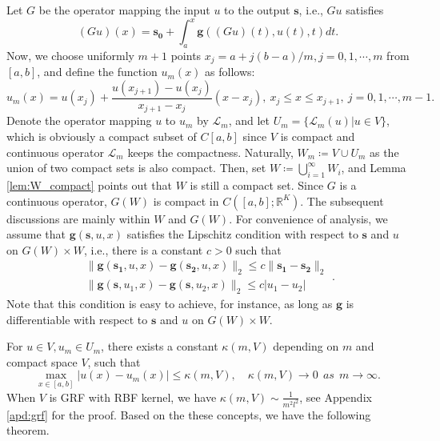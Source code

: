 \documentclass[11pt]{article}
\begin{document}
Let $G$ be the operator mapping the input $u$ to the output $\boldsymbol{s}$, i.e., $Gu$ satisfies
\begin{equation*}\label{eq:Gu}
    (Gu)(x)=\boldsymbol{s_0}+\int_a^x\boldsymbol{g}((Gu)(t),u(t),t)dt.
\end{equation*}
Now, we choose uniformly $m+1$ points $x_{j}=a+j(b-a)/m,j=0,1,\cdots,m$ from $[a,b]$, and define the function $u_{m}(x)$ as follows:
\begin{equation*}
    u_m(x)=u(x_j)+\frac{u(x_{j+1})-u(x_j)}{x_{j+1}-x_j} (x-x_j),\ x_j\leq x\leq x_{j+1},\ j=0,1,\cdots,m-1.
\end{equation*}
Denote the operator mapping $u$ to $u_{m}$ by $\mathcal{L}_{m}$, and let $U_{m}=\{\mathcal{L}_{m}(u)|u\in V\}$, which is obviously a compact subset of $C[a,b]$ since $V$ is compact and continuous operator $\mathcal{L}_{m}$  keeps the compactness. Naturally, $W_{m}\coloneqq V\cup U_{m}$ as the union of two compact sets is also compact. Then, set $W\coloneqq\bigcup_{i=1}^{\infty}W_{i}$, and Lemma \ref{lem:W_compact} points out that $W$ is still a compact set.
Since $G$ is a continuous operator,  $G(W)$ is compact in $C([a,b];\mathbb{R}^{K})$.
The subsequent discussions are mainly within $W$ and $G(W)$. For convenience of analysis, we assume that $\boldsymbol{g}(\boldsymbol{s},u,x)$ satisfies the Lipschitz condition with respect to $\boldsymbol{s}$ and $u$ on $G(W)\times W$, i.e., there is a constant $c>0$ such that
\begin{equation*}
    \begin{array}{l}
    \|\boldsymbol{g}(\boldsymbol{s_1},u,x)-\boldsymbol{g}(\boldsymbol{s_2},u,x)\|_{2}\leq c\|\boldsymbol{s_1}-\boldsymbol{s_2}\|_{2}\\
    \|\boldsymbol{g}(\boldsymbol{s},u_1,x)-\boldsymbol{g}(\boldsymbol{s},u_2,x)\|_{2}\leq c|u_1-u_2|
    \end{array}.
\end{equation*}
Note that this condition is easy to achieve, for instance, as long as $\boldsymbol{g}$ is differentiable with respect to $\boldsymbol{s}$ and $u$ on $G(W)\times W$.

For $u\in V,u_{m}\in U_{m}$, there exists a constant $\kappa(m,V)$ depending on $m$ and compact space $V$, such that
\begin{equation} \label{eq:max_bound}
    \max_{x\in[a,b]}|u(x)-u_m(x)|\leq\kappa(m,V),\quad \kappa(m,V)\rightarrow 0\ \ as\ \ m\rightarrow\infty.
\end{equation}
When $V$ is GRF with RBF kernel, we have $\kappa(m,V) \sim \frac{1}{m^2l^2}$, see Appendix \ref{apd:grf} for the proof.
Based on the these concepts, we have the following theorem.
\end{document}
